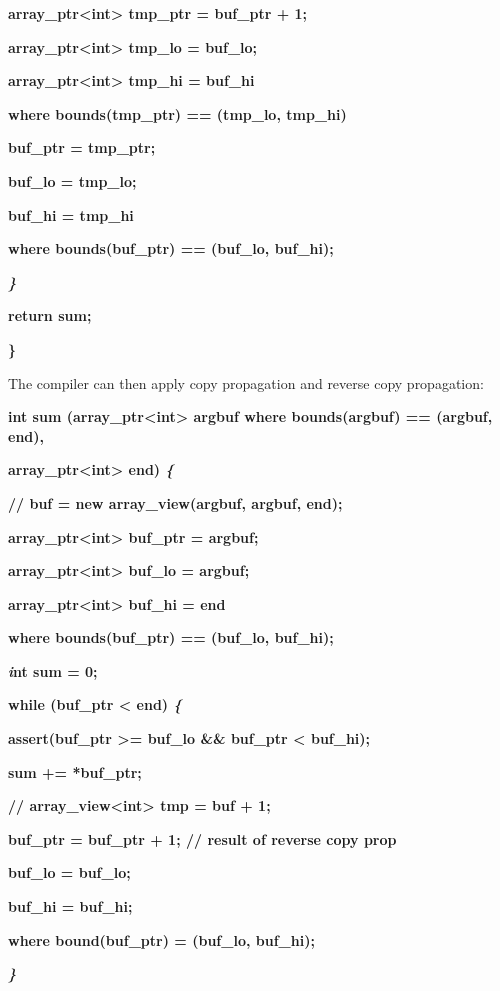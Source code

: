 \documentclass[]{article}
\begin{document}
\textbf{array\_ptr\textless{}int\textgreater{} tmp\_ptr = buf\_ptr + 1;}

\textbf{array\_ptr\textless{}int\textgreater{} tmp\_lo = buf\_lo;}

\textbf{array\_ptr\textless{}int\textgreater{} tmp\_hi = buf\_hi}

\textbf{where bounds(tmp\_ptr) == (tmp\_lo, tmp\_hi)}

\textbf{buf\_ptr = tmp\_ptr;}

\textbf{buf\_lo = tmp\_lo;}

\textbf{buf\_hi = tmp\_hi}

\textbf{where bounds(buf\_ptr) == (buf\_lo, buf\_hi);}

\emph{\textbf{\}}}

\textbf{return sum;}

\textbf{\}}

The compiler can then apply copy propagation and reverse copy
propagation:

\textbf{int sum (array\_ptr\textless{}int\textgreater{} argbuf where
bounds(argbuf) == (argbuf, end), }

\textbf{array\_ptr\textless{}int\textgreater{} end) \emph{\{}}

\textbf{// buf = new array\_view(argbuf, argbuf, end);}

\textbf{array\_ptr\textless{}int\textgreater{} buf\_ptr = argbuf; }

\textbf{array\_ptr\textless{}int\textgreater{} buf\_lo = argbuf;}

\textbf{array\_ptr\textless{}int\textgreater{} buf\_hi = end}

\textbf{where bounds(buf\_ptr) == (buf\_lo, buf\_hi);}

\textbf{\emph{i}nt sum = 0;}

\textbf{while (buf\_ptr \textless{} end) \emph{\{}}

\textbf{assert(buf\_ptr \textgreater{}= buf\_lo \&\& buf\_ptr
\textless{} buf\_hi);}

\textbf{sum += *buf\_ptr;}

\textbf{// array\_view\textless{}int\textgreater{} tmp = buf + 1;}

\textbf{buf\_ptr = buf\_ptr + 1; // result of reverse copy prop}

\textbf{buf\_lo = buf\_lo;}

\textbf{buf\_hi = buf\_hi;}

\textbf{where bound(buf\_ptr) = (buf\_lo, buf\_hi);}

\emph{\textbf{\}}}
\end{document}

